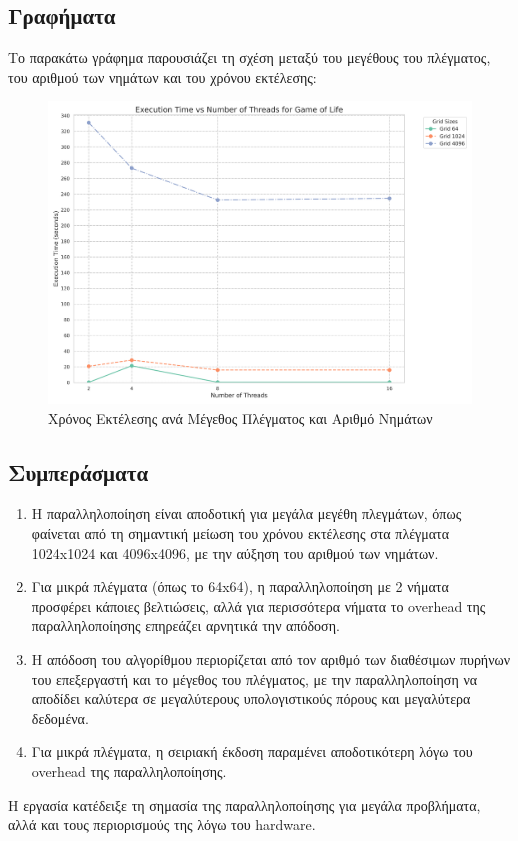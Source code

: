 \documentclass{article}
\begin{document}
\subsection*{Γραφήματα}
Το παρακάτω γράφημα παρουσιάζει τη σχέση μεταξύ του μεγέθους του πλέγματος, του αριθμού των νημάτων και του χρόνου εκτέλεσης:
\begin{figure}[h]
    \centering
    \includegraphics[width=1\textwidth]{game_of_life_results.png}
    \caption{Χρόνος Εκτέλεσης ανά Μέγεθος Πλέγματος και Αριθμό Νημάτων}
\end{figure}
\subsection*{Συμπεράσματα}
\begin{enumerate}
    \item Η παραλληλοποίηση είναι αποδοτική για μεγάλα μεγέθη πλεγμάτων, όπως φαίνεται από τη σημαντική μείωση του χρόνου εκτέλεσης στα πλέγματα 1024x1024 και 4096x4096, με την αύξηση του αριθμού των νημάτων.
    \item Για μικρά πλέγματα (όπως το 64x64), η παραλληλοποίηση με 2 νήματα προσφέρει κάποιες βελτιώσεις, αλλά για περισσότερα νήματα το overhead της παραλληλοποίησης επηρεάζει αρνητικά την απόδοση.
    \item Η απόδοση του αλγορίθμου περιορίζεται από τον αριθμό των διαθέσιμων πυρήνων του επεξεργαστή και το μέγεθος του πλέγματος, με την παραλληλοποίηση να αποδίδει καλύτερα σε μεγαλύτερους υπολογιστικούς πόρους και μεγαλύτερα δεδομένα.
    \item Για μικρά πλέγματα, η σειριακή έκδοση παραμένει αποδοτικότερη λόγω του overhead της παραλληλοποίησης.
\end{enumerate}
Η εργασία κατέδειξε τη σημασία της παραλληλοποίησης για μεγάλα προβλήματα, αλλά και τους περιορισμούς της λόγω του hardware.
\end{document}
